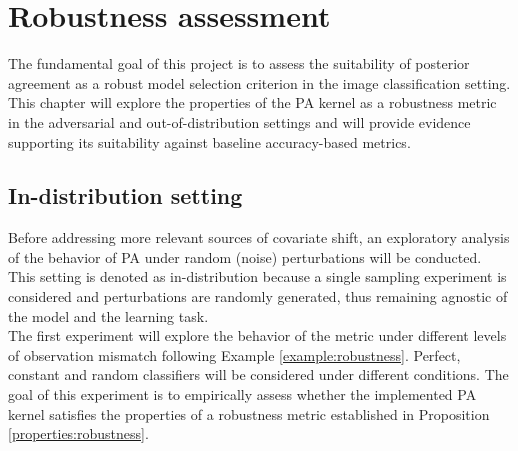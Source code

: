 \chapter{Robustness assessment}\label{chapter:robustness_assessment}

The fundamental goal of this project is to assess the suitability of posterior
agreement as a robust model selection criterion in the image classification setting.
This chapter will explore the properties of the PA kernel as a robustness metric in the
adversarial and out-of-distribution settings and will provide evidence supporting 
its suitability against baseline accuracy-based metrics.

\section{In-distribution setting}\label{sec:results_robustness}

Before addressing more relevant sources of covariate shift, an exploratory analysis
of the behavior of PA under random (noise) perturbations will be conducted. This
setting is denoted as in-distribution because a single sampling experiment is 
considered and perturbations are randomly generated, thus remaining agnostic of the
model and the learning task. \\

The first experiment will explore the behavior of the metric under different levels of 
observation mismatch following Example \ref{example:robustness}. Perfect, constant and random
classifiers will be considered under different conditions. The goal of this
experiment is to empirically assess whether the implemented PA kernel satisfies the 
properties of a robustness metric established in Proposition \ref{properties:robustness}.

